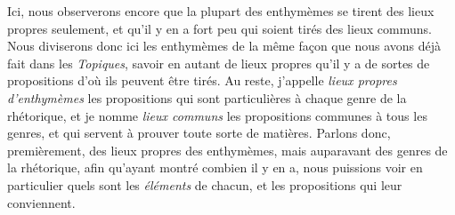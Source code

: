 Ici, nous observerons encore que la plupart des enthymèmes se tirent des lieux propres seulement, et qu'il y en a fort peu qui soient tirés des lieux
communs. Nous diviserons donc ici les enthymèmes de la même façon que nous avons déjà fait dans les \emph{Topiques}, savoir en autant de lieux propres
qu'il y a de sortes de propositions d'où ils peuvent être tirés. Au reste, j'appelle \emph{lieux propres d'enthymèmes} les propositions qui sont
particulières à chaque genre de la rhétorique, et je nomme \emph{lieux communs} les propositions communes à tous les genres, et qui servent à prouver
toute sorte de matières. Parlons donc, premièrement, des lieux propres des enthymèmes, mais auparavant des genres de la rhétorique, afin qu'ayant montré
combien il y en a, nous puissions voir en particulier quels sont les \emph{éléments} de chacun, et les propositions qui leur conviennent.

